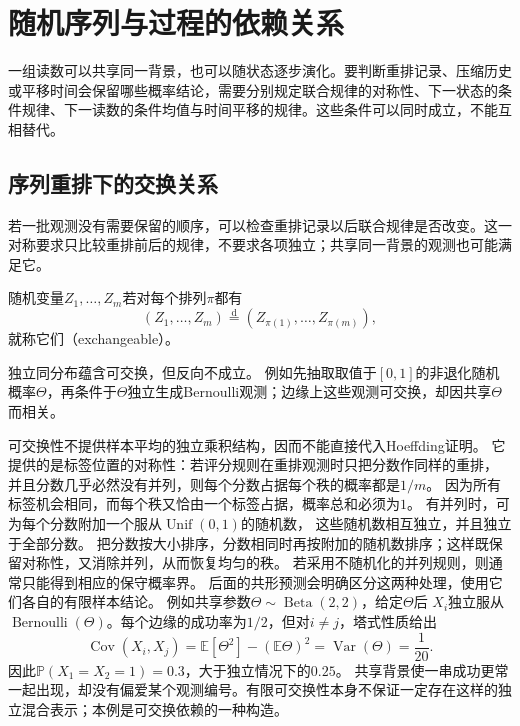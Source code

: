 \section{随机序列与过程的依赖关系}
\label{sec:stoch-process-dependence}
一组读数可以共享同一背景，也可以随状态逐步演化。要判断重排记录、压缩历史或平移时间会保留哪些概率结论，需要分别规定联合规律的对称性、下一状态的条件规律、下一读数的条件均值与时间平移的规律。这些条件可以同时成立，不能互相替代。

\subsection{序列重排下的交换关系}

若一批观测没有需要保留的顺序，可以检查重排记录以后联合规律是否改变。这一对称要求只比较重排前后的规律，不要求各项独立；共享同一背景的观测也可能满足它。
\label{sec:rv-exchangeability}
\begin{definition}[可交换随机变量]
  \label{def:probability-exchangeability}
随机变量\(Z_1,\ldots,Z_m\)若对每个排列\(\pi\)都有
\[ (Z_1,\ldots,Z_m)
  \overset{\mathrm{d}}{=}(Z_{\pi(1)},\ldots,Z_{\pi(m)}), \]
就称它们（exchangeable）。
\end{definition}
独立同分布蕴含可交换，但反向不成立。
例如先抽取取值于\([0,1]\)的非退化随机概率\(\Theta\)，再条件于\(\Theta\)独立生成Bernoulli观测；边缘上这些观测可交换，却因共享\(\Theta\)而相关。

可交换性不提供样本平均的独立乘积结构，因而不能直接代入Hoeffding证明。
它提供的是标签位置的对称性：若评分规则在重排观测时只把分数作同样的重排，
并且分数几乎必然没有并列，则每个分数占据每个秩的概率都是\(1/m\)。
因为所有标签机会相同，而每个秩又恰由一个标签占据，概率总和必须为\(1\)。
有并列时，可为每个分数附加一个服从\(\operatorname{Unif}(0,1)\)的随机数，
这些随机数相互独立，并且独立于全部分数。
把分数按大小排序，分数相同时再按附加的随机数排序；这样既保留对称性，又消除并列，从而恢复均匀的秩。
若采用不随机化的并列规则，则通常只能得到相应的保守概率界。
后面的共形预测会明确区分这两种处理，使用它们各自的有限样本结论。
例如共享参数\(\Theta\sim\operatorname{Beta}(2,2)\)，给定\(\Theta\)后
\(X_i\)独立服从\(\operatorname{Bernoulli}(\Theta)\)。每个边缘的成功率为\(1/2\)，但对\(i\ne j\)，塔式性质给出
\[
\operatorname{Cov}(X_i,X_j)
=\mathbb E[\Theta^2]-(\mathbb E\Theta)^2
=\operatorname{Var}(\Theta)=\frac1{20}.
\]
因此\(\mathbb P(X_1=X_2=1)=0.3\)，大于独立情况下的\(0.25\)。
共享背景使一串成功更常一起出现，却没有偏爱某个观测编号。有限可交换性本身不保证一定存在这样的独立混合表示；本例是可交换依赖的一种构造。

